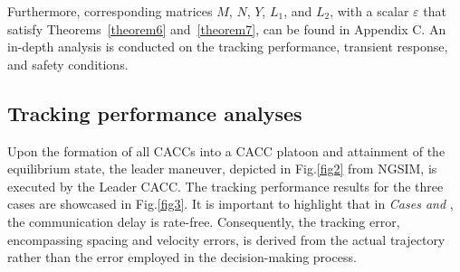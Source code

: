 \documentclass[a4paper]{cas-sc}
\begin{document}
\begin{enumerate}
\end{enumerate}

Furthermore, corresponding matrices $M$, $N$, $Y$, $L_1$, and $L_2$, with a scalar $\varepsilon$ that satisfy Theorems~\ref{theorem6} and~\ref{theorem7}, can be found in Appendix C. An in-depth analysis is conducted on the tracking performance, transient response, and safety conditions.



\subsection{Tracking performance analyses}
\label{Section 5.2}

Upon the formation of all CACCs into a CACC platoon and attainment of the equilibrium state, the leader maneuver, depicted in Fig.\ref{fig2} from NGSIM, is executed by the Leader CACC. The tracking performance results for the three cases are showcased in Fig.\ref{fig3}. It is important to highlight that in \textit{Cases \uppercase\expandafter{} and \uppercase\expandafter{}}, the communication delay is rate-free. Consequently, the tracking error, encompassing spacing and velocity errors, is derived from the actual trajectory rather than the error employed in the decision-making process.
\end{document}
